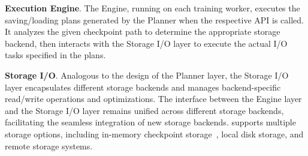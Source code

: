 \noindent \textbf{Execution Engine}.
The Engine, running on each training worker, executes the saving/loading plans generated by the Planner when the respective API is called. It analyzes the given checkpoint path to determine the appropriate storage backend, then interacts with the Storage I/O layer to execute the actual I/O tasks specified in the plans.


\noindent \textbf{Storage I/O}.
Analogous to the design of the Planner layer, the Storage I/O layer encapsulates different storage backends and manages backend-specific read/write operations and optimizations. 
The interface between the Engine layer and the Storage I/O layer remains unified across different storage backends, facilitating the seamless integration of new storage backends.
\sys{} supports multiple storage options, including in-memory checkpoint storage~\cite{gemini-sys}, local disk storage, and remote storage systems.

